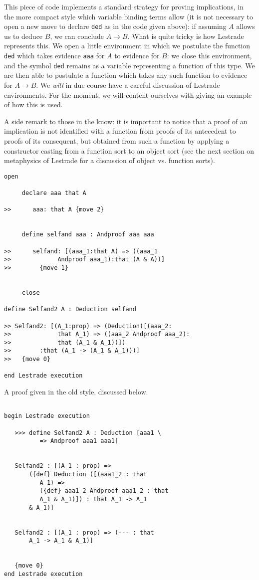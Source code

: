 \documentclass[12pt]{article}
\begin{document}
This piece of code implements a standard strategy for proving implications, in the more compact style which variable binding terms allow (it is not necessary to open a new move to declare {\tt ded} as in the code given above):  if assuming $A$ allows us to deduce $B$, we can conclude $A \rightarrow B$.  What is quite tricky is how Lestrade represents this.  We open a little environment in which we postulate the function {\tt ded} which takes 
evidence {\tt aaa} for $A$ to evidence for $B$:  we close this environment, and the symbol {\tt ded} remains as a variable representing a function of this type.  We are then able to postulate a function which takes any such function to evidence for $A \rightarrow B$.  We {\em will\/} in due course have a careful discussion of Lestrade environments.  For the moment, we will content ourselves with giving an example of how this is used.

A side remark to those in the know:  it is important to notice that a proof of an implication is not identified with a function from proofs of its antecedent to proofs of its consequent, but obtained from such a function by applying a constructor casting from a function sort to an object sort (see the next section on metaphysics of Lestrade for a discussion of object vs. function sorts).

   \begin{verbatim}
open

     declare aaa that A

>>      aaa: that A {move 2}


     define selfand aaa : Andproof aaa aaa

>>      selfand: [(aaa_1:that A) => ((aaa_1 
>>             Andproof aaa_1):that (A & A))]
>>        {move 1}


     close

define Selfand2 A : Deduction selfand

>> Selfand2: [(A_1:prop) => (Deduction([(aaa_2:
>>             that A_1) => ((aaa_2 Andproof aaa_2):
>>             that (A_1 & A_1))])
>>        :that (A_1 -> (A_1 & A_1)))]
>>   {move 0}

end Lestrade execution
\end{verbatim}

A proof given in the old style, discussed below.

\begin{verbatim}

begin Lestrade execution

   >>> define Selfand2 A : Deduction [aaa1 \
          => Andproof aaa1 aaa1]


   Selfand2 : [(A_1 : prop) => 
       ({def} Deduction ([(aaa1_2 : that 
          A_1) => 
          ({def} aaa1_2 Andproof aaa1_2 : that 
          A_1 & A_1)]) : that A_1 -> A_1 
       & A_1)]


   Selfand2 : [(A_1 : prop) => (--- : that 
       A_1 -> A_1 & A_1)]


   {move 0}
end Lestrade execution
\end{verbatim}
\end{document}
